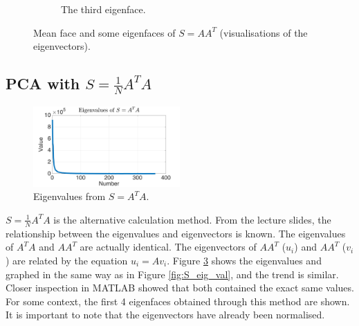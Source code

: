 \documentclass[a4paper, 10pt, conference]{ieeeconf}
\begin{document}
\begin{figure}[ht]
\begin{subfigure}{0.2\textwidth}
                \caption{The third eigenface.}
                \label{fig:eigface3}
        \end{subfigure}
	\caption{Mean face and some eigenfaces of $S = AA^T$ (visualisations of the eigenvectors).}
\end{figure}

\subsection{PCA with $S = \frac{1}{N}A^{T}A$}

\begin{figure}[h]
    \centering
    \includegraphics[width=0.5\textwidth]{src/S2_eig_val_rounded.png}
    \caption{Eigenvalues from $S = A^T A$.}
    \label{fig:S2_eig_val}
\end{figure}

$S = \frac{1}{N}A^{T}A$ is the alternative calculation method. From the lecture slides, the relationship between the eigenvalues and eigenvectors is known. The eigenvalues of $A^T A$ and $AA^T$ are actually identical. The eigenvectors of $AA^T$ ($u_i$) and $AA^T$ ($v_i$) are related by the equation $u_i = A v_i$. Figure \ref{fig:S2_eig_val} shows the eigenvalues and graphed in the same way as in Figure \ref{fig:S_eig_val}, and the trend is similar. Closer inspection in MATLAB showed that both contained the exact same values. For some context, the first 4 eigenfaces obtained through this method are shown. It is important to note that the eigenvectors have already been normalised.
\end{document}
